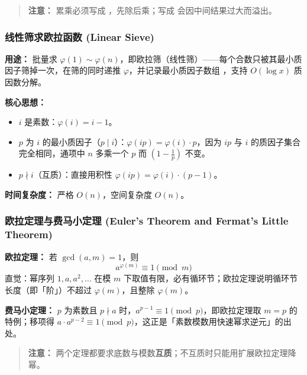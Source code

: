 \begin{quote}
\textbf{注意：} 累乘必须写成 ，先除后乘；写成  会因中间结果过大而溢出。
\end{quote}

\subsubsection{线性筛求欧拉函数 (Linear Sieve)}

\textbf{用途：}
批量求 $\varphi(1) \sim \varphi(n)$，即欧拉筛（线性筛）——每个合数只被其最小质因子筛掉一次，在筛的同时递推 $\varphi$，并记录最小质因子数组 ，支持 $O(\log x)$ 质因数分解。

\textbf{核心思想：}
\begin{itemize}
    \item $i$ 是素数：$\varphi(i) = i - 1$。
    \item $p$ 为 $i$ 的最小质因子（$p \mid i$）：$\varphi(ip) = \varphi(i) \cdot p$，因为 $ip$ 与 $i$ 的质因子集合完全相同，通项中 $n$ 多乘一个 $p$ 而 $\left(1 - \frac{1}{p}\right)$ 不变。
    \item $p \nmid i$（互质）：直接用积性 $\varphi(ip) = \varphi(i) \cdot (p-1)$。
\end{itemize}

\textbf{时间复杂度：} 严格 $O(n)$，空间复杂度 $O(n)$。



\subsubsection{欧拉定理与费马小定理 (Euler's Theorem and Fermat's Little Theorem)}

\textbf{欧拉定理：} 若 $\gcd(a, m) = 1$，则
\[
a^{\varphi(m)} \equiv 1 \pmod{m}
\]
直觉：幂序列 $1, a, a^{2}, \dots$ 在模 $m$ 下取值有限，必有循环节；欧拉定理说明循环节长度（即「阶」）不超过 $\varphi(m)$，且整除 $\varphi(m)$。

\textbf{费马小定理：} $p$ 为素数且 $p \nmid a$ 时，$a^{p-1} \equiv 1 \pmod{p}$，即欧拉定理取 $m = p$ 的特例；移项得 $a \cdot a^{p-2} \equiv 1 \pmod{p}$，这正是「素数模数用快速幂求逆元」的出处。

\begin{quote}
\textbf{注意：} 两个定理都要求底数与模数\textbf{互质}；不互质时只能用扩展欧拉定理降幂。
\end{quote}

